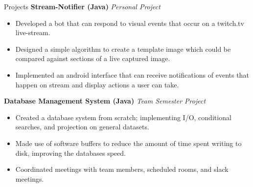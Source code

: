 \documentclass{resume} %
\begin{document}
\begin{rSection}{Projects}
{\bf Stream-Notifier (Java)} \hfill {\em Personal Project}
\begin{itemize}[noitemsep]
    \item Developed a bot that can respond to visual events that occur on a twitch.tv live-stream. 
    \item Designed a simple algorithm to create a template image which could be compared against sections of a live captured image.
    \item Implemented an android interface that can receive notifications of events that happen on stream and display actions a user can take.
\end{itemize}

{\bf Database Management System (Java)} \hfill {\em Team Semester Project}
\begin{itemize}[noitemsep]
    \item Created a database system from scratch; implementing I/O, conditional searches, and projection on general datasets.
    \item Made use of software buffers to reduce the amount of time spent writing to disk, improving the databases speed. 
    \item Coordinated meetings with team members, scheduled rooms, and slack meetings.
\end{itemize}


\end{rSection}
\end{document}

